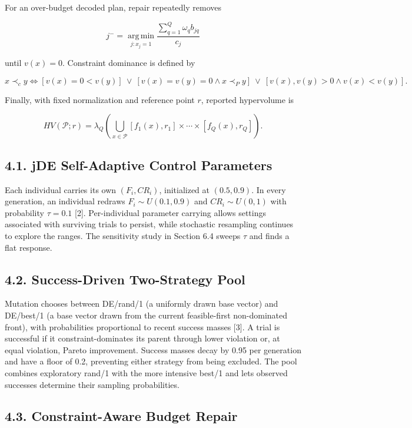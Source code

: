 \documentclass[
  10pt,
  a4paper,
]{article}
\begin{document}
For an over-budget decoded plan, repair repeatedly removes

\[
j^-=\operatorname*{arg\,min}_{j:x_j=1}
\frac{\sum_{q=1}^{Q}\omega_q b_{jq}}{c_j}
\]

until \(v(x)=0\). Constraint dominance is defined by

\[
x\prec_c y\iff
[v(x)=0<v(y)]\ \lor\
[v(x)=v(y)=0\land x\prec_P y]\ \lor\
[v(x),v(y)>0\land v(x)<v(y)].
\]

Finally, with fixed normalization and reference point \(r\), reported
hypervolume is

\[
HV(\mathcal P;r)=\lambda_Q\!\left(\bigcup_{x\in\mathcal P}
[f_1(x),r_1]\times\cdots\times[f_Q(x),r_Q]\right).
\]

\subsection{4.1. jDE Self-Adaptive Control
Parameters}\label{jde-self-adaptive-control-parameters}

Each individual carries its own \((F_i, CR_i)\), initialized at
\((0.5, 0.9)\). In every generation, an individual redraws
\(F_i \sim U(0.1, 0.9)\) and \(CR_i \sim U(0, 1)\) with probability
\(\tau = 0.1\) {[}2{]}. Per-individual parameter carrying allows
settings associated with surviving trials to persist, while stochastic
resampling continues to explore the ranges. The sensitivity study in
Section 6.4 sweeps \(\tau\) and finds a flat response.

\subsection{4.2. Success-Driven Two-Strategy
Pool}\label{success-driven-two-strategy-pool}

Mutation chooses between DE/rand/1 (a uniformly drawn base vector) and
DE/best/1 (a base vector drawn from the current feasible-first
non-dominated front), with probabilities proportional to recent success
masses {[}3{]}. A trial is successful if it constraint-dominates its
parent through lower violation or, at equal violation, Pareto
improvement. Success masses decay by 0.95 per generation and have a
floor of 0.2, preventing either strategy from being excluded. The pool
combines exploratory rand/1 with the more intensive best/1 and lets
observed successes determine their sampling probabilities.

\subsection{4.3. Constraint-Aware Budget
Repair}\label{constraint-aware-budget-repair}
\end{document}
